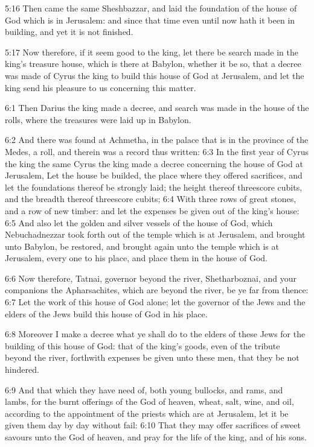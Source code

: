 5:16 Then came the same Sheshbazzar, and laid the foundation of the
house of God which is in Jerusalem: and since that time even until now
hath it been in building, and yet it is not finished.

5:17 Now therefore, if it seem good to the king, let there be search
made in the king's treasure house, which is there at Babylon, whether
it be so, that a decree was made of Cyrus the king to build this house
of God at Jerusalem, and let the king send his pleasure to us
concerning this matter.

6:1 Then Darius the king made a decree, and search was made in the
house of the rolls, where the treasures were laid up in Babylon.

6:2 And there was found at Achmetha, in the palace that is in the
province of the Medes, a roll, and therein was a record thus written:
6:3 In the first year of Cyrus the king the same Cyrus the king made a
decree concerning the house of God at Jerusalem, Let the house be
builded, the place where they offered sacrifices, and let the
foundations thereof be strongly laid; the height thereof threescore
cubits, and the breadth thereof threescore cubits; 6:4 With three rows
of great stones, and a row of new timber: and let the expenses be
given out of the king's house: 6:5 And also let the golden and silver
vessels of the house of God, which Nebuchadnezzar took forth out of
the temple which is at Jerusalem, and brought unto Babylon, be
restored, and brought again unto the temple which is at Jerusalem,
every one to his place, and place them in the house of God.

6:6 Now therefore, Tatnai, governor beyond the river, Shetharboznai,
and your companions the Apharsachites, which are beyond the river, be
ye far from thence: 6:7 Let the work of this house of God alone; let
the governor of the Jews and the elders of the Jews build this house
of God in his place.

6:8 Moreover I make a decree what ye shall do to the elders of these
Jews for the building of this house of God: that of the king's goods,
even of the tribute beyond the river, forthwith expenses be given unto
these men, that they be not hindered.

6:9 And that which they have need of, both young bullocks, and rams,
and lambs, for the burnt offerings of the God of heaven, wheat, salt,
wine, and oil, according to the appointment of the priests which are
at Jerusalem, let it be given them day by day without fail: 6:10 That
they may offer sacrifices of sweet savours unto the God of heaven, and
pray for the life of the king, and of his sons.


